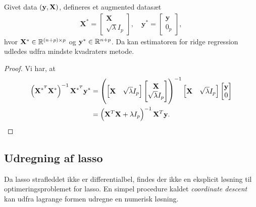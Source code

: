 \begin{lem}
Givet data \(\del{\y, \X}\), defineres et augmented datasæt
\begin{align*}
\mathbf{X}^* = \begin{bmatrix}
\mathbf{X} \\ \sqrt{\lambda} I_p
\end{bmatrix}, \quad 
\mathbf{y}^* = \begin{bmatrix}
\mathbf{y} \\ 0_p
\end{bmatrix},
\end{align*}
hvor \(\X^* \in \mathbb{R}^{\del{n+p} \times p}\) og \(\mathbf{y}^* \in \mathbb{R}^{n+p}\). Da kan estimatoren for ridge regression udledes udfra mindste kvadraters metode.
\end{lem}
\begin{proof}
Vi har, at
\begin{align*}
\del{\X^{*^T} \X^*}^{-1} \X^{*^T} \y^* &= \left( \begin{bmatrix}
\mathbf{X} & \sqrt{\lambda} I_p
\end{bmatrix}
\begin{bmatrix}
\mathbf{X} \\ \sqrt{\lambda} I_p
\end{bmatrix} \right)^{-1}
\begin{bmatrix}
\mathbf{X} & \sqrt{\lambda} I_p
\end{bmatrix}
\begin{bmatrix}
\mathbf{y} \\ 0
\end{bmatrix} \\
&= \left( \mathbf{X}^T \mathbf{X} + \lambda I_p \right)^{-1} \mathbf{X}^T \mathbf{y}.
\end{align*}
\end{proof}


\subsection{Udregning af lasso}
Da lasso strafleddet ikke er differentialbel, findes der ikke en eksplicit løsning til optimeringsproblemet for lasso.
En simpel procedure kaldet \textit{coordinate descent} kan udfra lagrange formen udregne en numerisk løsning. 

